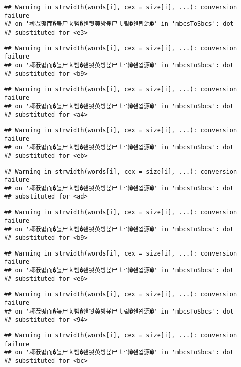 \documentclass[]{article}
\begin{document}
\begin{verbatim}
## Warning in strwidth(words[i], cex = size[i], ...): conversion failure
## on '椰꾨떯而�뵾尸ｋ뻼�쇈묏萸방뵾尸ｌ맄�쇈묍源�' in 'mbcsToSbcs': dot
## substituted for <e3>
\end{verbatim}

\begin{verbatim}
## Warning in strwidth(words[i], cex = size[i], ...): conversion failure
## on '椰꾨떯而�뵾尸ｋ뻼�쇈묏萸방뵾尸ｌ맄�쇈묍源�' in 'mbcsToSbcs': dot
## substituted for <b9>
\end{verbatim}

\begin{verbatim}
## Warning in strwidth(words[i], cex = size[i], ...): conversion failure
## on '椰꾨떯而�뵾尸ｋ뻼�쇈묏萸방뵾尸ｌ맄�쇈묍源�' in 'mbcsToSbcs': dot
## substituted for <a4>
\end{verbatim}

\begin{verbatim}
## Warning in strwidth(words[i], cex = size[i], ...): conversion failure
## on '椰꾨떯而�뵾尸ｋ뻼�쇈묏萸방뵾尸ｌ맄�쇈묍源�' in 'mbcsToSbcs': dot
## substituted for <eb>
\end{verbatim}

\begin{verbatim}
## Warning in strwidth(words[i], cex = size[i], ...): conversion failure
## on '椰꾨떯而�뵾尸ｋ뻼�쇈묏萸방뵾尸ｌ맄�쇈묍源�' in 'mbcsToSbcs': dot
## substituted for <ad>
\end{verbatim}

\begin{verbatim}
## Warning in strwidth(words[i], cex = size[i], ...): conversion failure
## on '椰꾨떯而�뵾尸ｋ뻼�쇈묏萸방뵾尸ｌ맄�쇈묍源�' in 'mbcsToSbcs': dot
## substituted for <b9>
\end{verbatim}

\begin{verbatim}
## Warning in strwidth(words[i], cex = size[i], ...): conversion failure
## on '椰꾨떯而�뵾尸ｋ뻼�쇈묏萸방뵾尸ｌ맄�쇈묍源�' in 'mbcsToSbcs': dot
## substituted for <e6>
\end{verbatim}

\begin{verbatim}
## Warning in strwidth(words[i], cex = size[i], ...): conversion failure
## on '椰꾨떯而�뵾尸ｋ뻼�쇈묏萸방뵾尸ｌ맄�쇈묍源�' in 'mbcsToSbcs': dot
## substituted for <94>
\end{verbatim}

\begin{verbatim}
## Warning in strwidth(words[i], cex = size[i], ...): conversion failure
## on '椰꾨떯而�뵾尸ｋ뻼�쇈묏萸방뵾尸ｌ맄�쇈묍源�' in 'mbcsToSbcs': dot
## substituted for <bc>
\end{verbatim}
\end{document}
